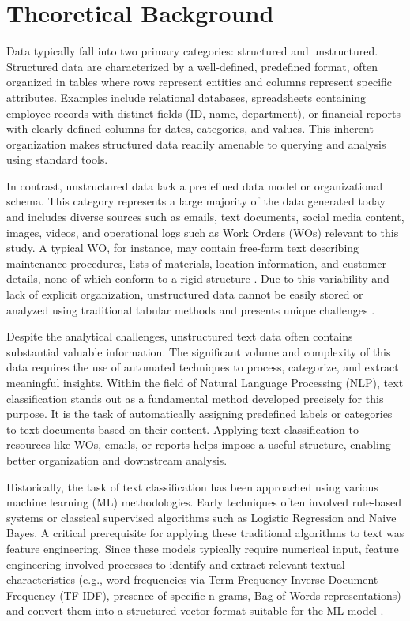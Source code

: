 \section{Theoretical Background}

Data typically fall into two primary categories: structured and unstructured. Structured data are characterized by a well-defined, predefined format, often organized in tables where rows represent entities and columns represent specific attributes. Examples include relational databases, spreadsheets containing employee records with distinct fields (ID, name, department), or financial reports with clearly defined columns for dates, categories, and values. This inherent organization makes structured data readily amenable to querying and analysis using standard tools.

In contrast, unstructured data lack a predefined data model or organizational schema. This category represents a large majority of the data generated today and includes diverse sources such as emails, text documents, social media content, images, videos, and operational logs such as Work Orders (WOs) relevant to this study. A typical WO, for instance, may contain free-form text describing maintenance procedures, lists of materials, location information, and customer details, none of which conform to a rigid structure \cite{ibm2023work}. Due to this variability and lack of explicit organization, unstructured data cannot be easily stored or analyzed using traditional tabular methods and presents unique challenges \cite{ibm2025datadiff}.

Despite the analytical challenges, unstructured text data often contains substantial valuable information. The significant volume and complexity of this data requires the use of automated techniques to process, categorize, and extract meaningful insights. Within the field of Natural Language Processing (NLP), text classification stands out as a fundamental method developed precisely for this purpose. It is the task of automatically assigning predefined labels or categories to text documents based on their content. Applying text classification to resources like WOs, emails, or reports helps impose a useful structure, enabling better organization and downstream analysis.

Historically, the task of text classification has been approached using various machine learning (ML) methodologies. Early techniques often involved rule-based systems or classical supervised algorithms such as Logistic Regression and Naive Bayes. A critical prerequisite for applying these traditional algorithms to text was feature engineering. Since these models typically require numerical input, feature engineering involved processes to identify and extract relevant textual characteristics (e.g., word frequencies via Term Frequency-Inverse Document Frequency (TF-IDF), presence of specific n-grams, Bag-of-Words representations) and convert them into a structured vector format suitable for the ML model \cite{bing2011mining}.


